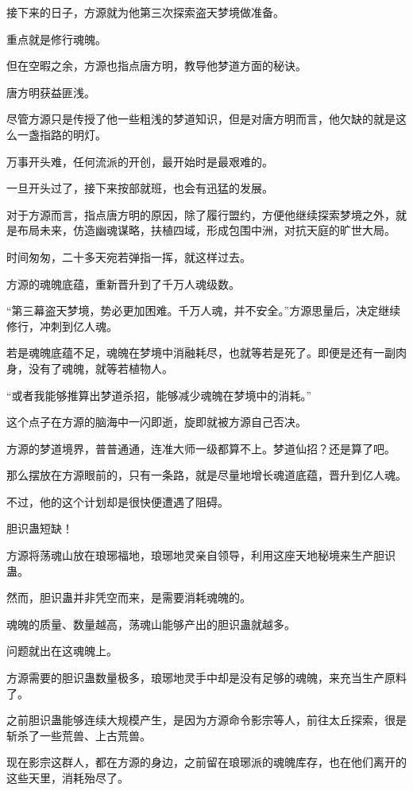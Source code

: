 \begin{this_body}
接下来的日子，方源就为他第三次探索盗天梦境做准备。

重点就是修行魂魄。

但在空暇之余，方源也指点唐方明，教导他梦道方面的秘诀。

唐方明获益匪浅。

尽管方源只是传授了他一些粗浅的梦道知识，但是对唐方明而言，他欠缺的就是这么一盏指路的明灯。

万事开头难，任何流派的开创，最开始时是最艰难的。

一旦开头过了，接下来按部就班，也会有迅猛的发展。

对于方源而言，指点唐方明的原因，除了履行盟约，方便他继续探索梦境之外，就是布局未来，仿造幽魂谋略，扶植四域，形成包围中洲，对抗天庭的旷世大局。

时间匆匆，二十多天宛若弹指一挥，就这样过去。

方源的魂魄底蕴，重新晋升到了千万人魂级数。

“第三幕盗天梦境，势必更加困难。千万人魂，并不安全。”方源思量后，决定继续修行，冲刺到亿人魂。

若是魂魄底蕴不足，魂魄在梦境中消融耗尽，也就等若是死了。即便是还有一副肉身，没有了魂魄，就等若植物人。

“或者我能够推算出梦道杀招，能够减少魂魄在梦境中的消耗。”

这个点子在方源的脑海中一闪即逝，旋即就被方源自己否决。

方源的梦道境界，普普通通，连准大师一级都算不上。梦道仙招？还是算了吧。

那么摆放在方源眼前的，只有一条路，就是尽量地增长魂道底蕴，晋升到亿人魂。

不过，他的这个计划却是很快便遭遇了阻碍。

胆识蛊短缺！

方源将荡魂山放在琅琊福地，琅琊地灵亲自领导，利用这座天地秘境来生产胆识蛊。

然而，胆识蛊并非凭空而来，是需要消耗魂魄的。

魂魄的质量、数量越高，荡魂山能够产出的胆识蛊就越多。

问题就出在这魂魄上。

方源需要的胆识蛊数量极多，琅琊地灵手中却是没有足够的魂魄，来充当生产原料了。

之前胆识蛊能够连续大规模产生，是因为方源命令影宗等人，前往太丘探索，很是斩杀了一些荒兽、上古荒兽。

现在影宗这群人，都在方源的身边，之前留在琅琊派的魂魄库存，也在他们离开的这些天里，消耗殆尽了。


\end{this_body}
